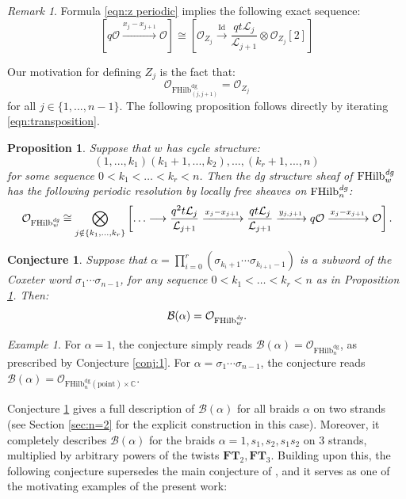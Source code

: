 \documentclass[12pt]{amsart}
\numberwithin{equation}{section}
\newtheorem{proposition}[theorem]{Proposition}
\newtheorem{conjecture}[theorem]{Conjecture}
\theoremstyle{definition}
\theoremstyle{remark}
\newtheorem{remark}[theorem]{Remark}
\newtheorem{example}[theorem]{Example}
\newcommand{\CC}{\mathbb{C}}
\newcommand{\CB}{\mathcal{B}}
\newcommand{\CL}{\mathcal{L}}
\newcommand{\CO}{\mathcal{O}}
\newcommand{\CT}{\mathcal{T}}
\newcommand{\FT}{\mathbf{FT}}
\renewcommand{\1}{\mathbf{1}}
\newcommand{\FH}{\mathrm{FHilb}}
\newcommand{\point}{\mathrm{point}}
\newcommand{\dg}{\text{dg}}%
\newcommand{\edg}{\emph{dg}}
\begin{document}
\begin{remark}
Formula \eqref{eqn:z periodic} implies the following exact sequence:
\begin{equation}
\label{eqn:Z recursion}
\left[ q\CO\xrightarrow{x_j-x_{j+1}}\CO \right] \cong \left[\CO_{Z_j} \xrightarrow{\text{Id}} \frac {qt\CL_j}{\CL_{j+1}} \otimes \CO_{Z_j} [2] \right]
\end{equation}
\end{remark}

Our motivation for defining $Z_j$ is the fact that:
\begin{equation}
\label{eqn:transposition}
\CO_{\FH_{(j,j+1)}^\dg} = \CO_{Z_j}
\end{equation}
for all $j\in \{1,...,n-1\}$. The following proposition follows directly by iterating \eqref{eqn:transposition}.

\begin{proposition}
\label{prop:fh eqiv}
Suppose that $w$ has cycle structure:
$$
(1,...,k_1)(k_1+1,...,k_2),...,(k_{r}+1,...,n)
$$
for some sequence $0<k_1<\ldots<k_{r}<n$. Then the dg structure sheaf of $\FH_w^\edg$ has the following periodic resolution by locally free sheaves on $\FH_n^{\edg}$:
\begin{multline}
\label{eq:mf}
\CO_{\FH_w^{\edg}} \cong \bigotimes_{j\notin \{k_1,...,k_r\}} \left[\ldots \longrightarrow \frac {q^2t\CL_j}{\CL_{j+1}} \xrightarrow{x_j-x_{j+1}} \frac {qt\CL_j}{\CL_{j+1}} \xrightarrow{y_{j,j+1}}  q\CO \xrightarrow{x_j-x_{j+1}} \CO \right].
\end{multline}
\end{proposition}

\begin{conjecture}
\label{conj:knots}
Suppose that $\alpha = \prod_{i=0}^{r}(\sigma_{k_i+1}\cdots\sigma_{k_{i+1}-1})$ is a subword of the Coxeter word $\sigma_1\cdots\sigma_{n-1}$, for any sequence $0<k_1<\ldots<k_{r}<n$ as in Proposition \ref{prop:fh eqiv}. Then:
$$
\CB(\alpha) = \CO_{\FH_w^{\edg}}.
$$
\end{conjecture}

\begin{example}
\label{ex:coxeter}
For $\alpha=1$, the conjecture simply reads $\CB(\alpha) = \CO_{\FH_n^{\dg}}$, as prescribed by Conjecture \ref{conj:1}. For $\alpha = \sigma_1\cdots\sigma_{n-1}$, the conjecture reads $\CB(\alpha) = \CO_{\FH_n^{\dg}(\point)\times \CC}$.
\end{example}

Conjecture \ref{conj:knots} gives a full description of $\CB(\alpha)$ for all braids $\alpha$ on two strands (see Section \ref{sec:n=2} for the explicit construction in this case). Moreover, it completely describes $\CB(\alpha)$ for the braids $\alpha = 1,s_1,s_2,s_1s_2$ on 3 strands, multiplied by arbitrary powers of the twists $\FT_2,\FT_3$. Building upon this, the following conjecture supersedes the main conjecture of \cite{GN}, and it serves as one of the motivating examples of the present work:
\end{document}
